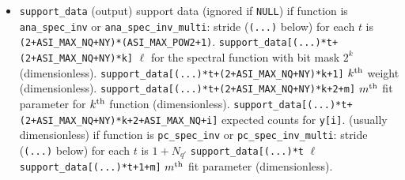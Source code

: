 \documentclass{article}    %
\begin{document}
\begin{itemize}
\item \verb|support_data| (output) support data (ignored if \verb|NULL|)
\subitem if function is \verb|ana_spec_inv| or \verb|ana_spec_inv_multi|:
\subitem stride (\verb|(...)| below) for each $t$ is \verb|(2+ASI_MAX_NQ+NY)*(ASI_MAX_POW2+1)|. 
\subitem \verb|support_data[(...)*t+(2+ASI_MAX_NQ+NY)*k]| $\ell$ for the spectral function with bit mask $2^k$ (dimensionless).
\subitem \verb|support_data[(...)*t+(2+ASI_MAX_NQ+NY)*k+1]| $k^{\rm th}$ weight  (dimensionless).
\subitem \verb|support_data[(...)*t+(2+ASI_MAX_NQ+NY)*k+2+m]| $m^{\rm th}$ fit parameter for $k^{\rm th}$ function  (dimensionless).
\subitem \verb|support_data[(...)*t+(2+ASI_MAX_NQ+NY)*k+2+ASI_MAX_NQ+i]| expected counts for \verb|y[i]|. (usually dimensionless)
\subitem if function is \verb|pc_spec_inv| or \verb|pc_spec_inv_multi|:
\subitem stride (\verb|(...)| below) for each $t$ is $1+N_{q'}$
\subitem \verb|support_data[(...)*t| $\ell$ 
\subitem \verb|support_data[(...)*t+1+m]| $m^{\rm th}$ fit parameter (dimensionless).
\end{itemize}
\end{document}
